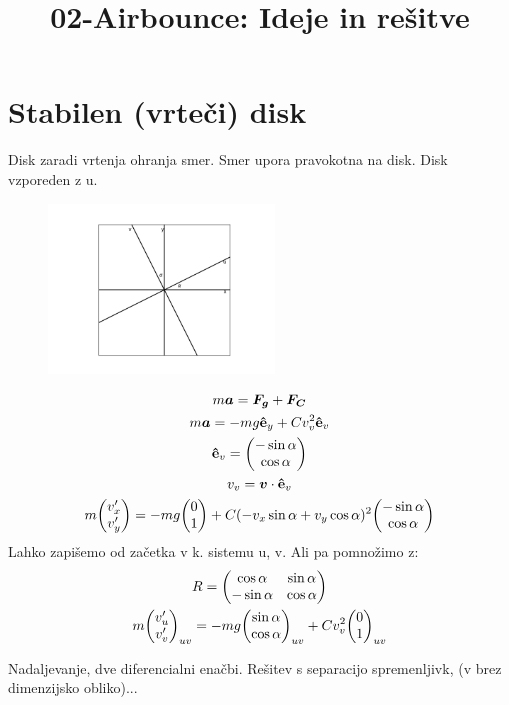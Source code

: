 \documentclass[11pt,a4paper]{article}
\title{02-Airbounce: Ideje in rešitve}
\date{}
\begin{document}
\maketitle

\section{Stabilen (vrteči) disk}
Disk zaradi vrtenja ohranja smer. Smer upora pravokotna na disk. Disk vzporeden z u.
\begin{figure}[H]
\centering
	\includegraphics[width=6cm]{stabilen_disk_kot_frizbija.png}
\end{figure}

\begin{gather}
m \bm{a} = \bm{{F_g}} + \bm{F_C}\\
m \bm{a} = -mg \vu{e}_y + C v_v^2 \vu{e}_v\\
\vu{e}_v = \mqty(-\sin \alpha \\ \cos \alpha)\\
v_v = \bm{v} \cdot \vu{e}_v\\
m \mqty(v_x' \\ v_y') = -mg \mqty(0 \\ 1) + C (-v_x \sin \alpha + v_y \cos \alpha)^2 \mqty(-\sin \alpha \\ \cos \alpha)
\end{gather}
Lahko zapišemo od začetka v k. sistemu u, v. Ali pa pomnožimo z:
\begin{gather}
R = \mqty(\cos \alpha & \sin \alpha \\ -\sin \alpha & \cos \alpha)\\
m \mqty(v_u' \\ v_v')_{uv} = -mg \mqty(\sin \alpha \\ \cos \alpha)_{uv} + C v_v^2 \mqty(0 \\ 1)_{uv}
\end{gather}

Nadaljevanje, dve diferencialni enačbi. Rešitev s separacijo spremenljivk, (v brez dimenzijsko obliko)...
\end{document}
